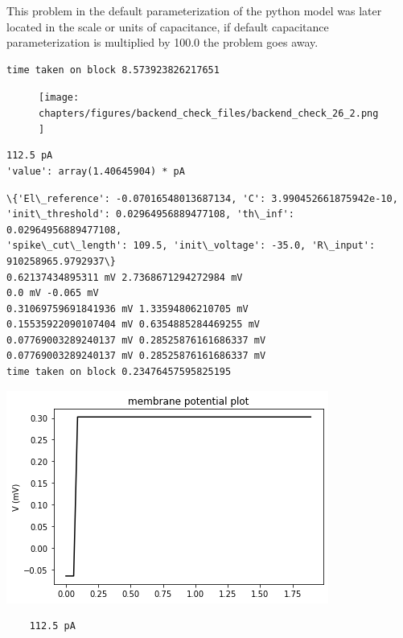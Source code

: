 This problem in the default parameterization of the python model was
later located in the scale or units of capacitance, if default
capacitance parameterization is multiplied by 100.0 the problem goes
away.

    \begin{verbatim}
time taken on block 8.573923826217651
    \end{verbatim}


    \begin{center}
    \begin{figure}
    \texttt{[image: chapters/figures/backend\_check\_files/backend\_check\_26\_2.png]}
    \end{figure}
    
    \end{center}
\begin{verbatim}
112.5 pA
'value': array(1.40645904) * pA
\end{verbatim}


\begin{verbatim}
\{'El\_reference': -0.07016548013687134, 'C': 3.990452661875942e-10,
'init\_threshold': 0.02964956889477108, 'th\_inf': 0.02964956889477108,
'spike\_cut\_length': 109.5, 'init\_voltage': -35.0, 'R\_input': 910258965.9792937\}
0.62137434895311 mV 2.7368671294272984 mV
0.0 mV -0.065 mV
0.31069759691841936 mV 1.33594806210705 mV
0.15535922090107404 mV 0.6354885284469255 mV
0.07769003289240137 mV 0.28525876161686337 mV
0.07769003289240137 mV 0.28525876161686337 mV
time taken on block 0.23476457595825195
\end{verbatim}

    

    
    \begin{center}
    \includegraphics{backend_check_files/backend_check_28_3.png}
    \end{center}
    \begin{verbatim}
    112.5 pA
    \end{verbatim}

